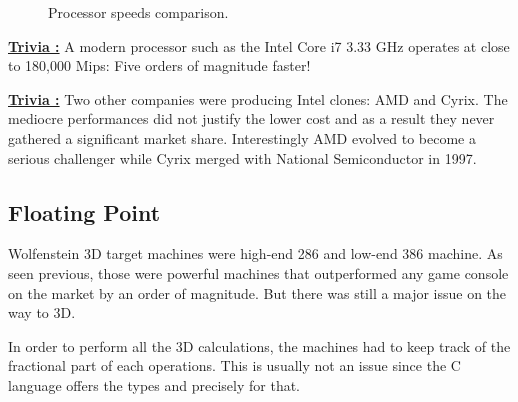 \documentclass[book.tex]{subfiles}
\begin{document}


\begin{figure}[H]
\centering
   \caption{Processor speeds comparison.} \label{fig:mips}
 \end{figure}

 \textbf{\underline{Trivia :}} A modern processor such as the Intel Core i7 3.33 GHz operates at close to 180,000 Mips: Five orders of magnitude faster!

 \bigskip

\textbf{\underline{Trivia :}}  Two other companies were producing Intel clones: AMD and Cyrix. The mediocre performances did not justify the lower cost and as a result they never gathered a significant market share. Interestingly AMD evolved to become a serious challenger while Cyrix merged with National Semiconductor in 1997.










  \subsection{Floating Point}
  
  Wolfenstein 3D target machines were high-end 286 and low-end 386 machine. As seen previous, those were powerful machines that outperformed any game console on the market by an order of magnitude. But there was still a major issue on the way to 3D.

   \bigskip
 
  In order to perform all the 3D calculations, the machines had to keep track of the fractional part of each operations. This is usually not an issue since the C language offers the types  and  precisely for that.
\end{document}
